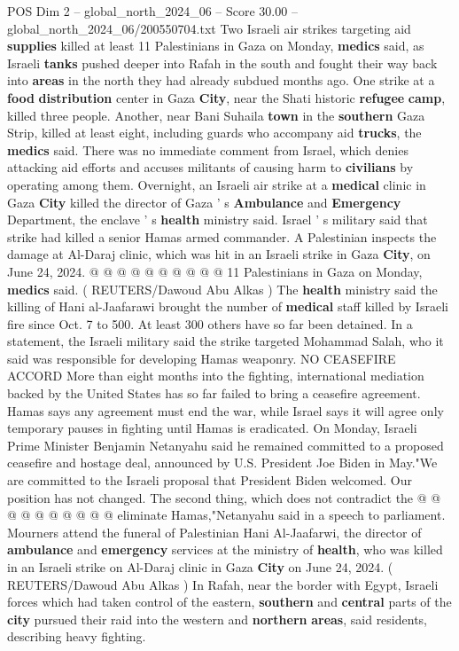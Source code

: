 \begin{textsample}{POS Dim 2 – global\_north\_2024\_06 – Score 30.00 – global\_north\_2024\_06/200550704.txt}  \label{ex:f2_pos_254}
Two Israeli air strikes targeting aid \textbf{supplies} killed at least 11 Palestinians in Gaza on Monday, \textbf{medics} said, as Israeli \textbf{tanks} pushed deeper into Rafah in the south and fought their way back into \textbf{areas} in the north they had already subdued months ago.
One strike at a \textbf{food} \textbf{distribution} center in Gaza \textbf{City}, near the Shati historic \textbf{refugee} \textbf{camp}, killed three people.
Another, near Bani Suhaila \textbf{town} in the \textbf{southern} Gaza Strip, killed at least eight, including guards who accompany aid \textbf{trucks}, the \textbf{medics} said.
There was no immediate comment from Israel, which denies attacking aid efforts and accuses militants of causing harm to \textbf{civilians} by operating among them.
Overnight, an Israeli air strike at a \textbf{medical} clinic in Gaza \textbf{City} killed the director of Gaza ' s \textbf{Ambulance} and \textbf{Emergency} Department, the enclave ' s \textbf{health} ministry said.
Israel ' s military said that strike had killed a senior Hamas armed commander.
A Palestinian inspects the damage at Al-Daraj clinic, which was hit in an Israeli strike in Gaza \textbf{City}, on June 24, 2024. @ @ @ @ @ @ @ @ @ @ 11 Palestinians in Gaza on Monday, \textbf{medics} said. ( REUTERS/Dawoud Abu Alkas ) The \textbf{health} ministry said the killing of Hani al-Jaafarawi brought the number of \textbf{medical} staff killed by Israeli fire since Oct. 7 to 500.
At least 300 others have so far been detained.
In a statement, the Israeli military said the strike targeted Mohammad Salah, who it said was responsible for developing Hamas weaponry.
NO CEASEFIRE ACCORD More than eight months into the fighting, international mediation backed by the United States has so far failed to bring a ceasefire agreement.
Hamas says any agreement must end the war, while Israel says it will agree only temporary pauses in fighting until Hamas is eradicated.
On Monday, Israeli Prime Minister Benjamin Netanyahu said he remained committed to a proposed ceasefire and hostage deal, announced by U.S.
President Joe Biden in May."We are committed to the Israeli proposal that President Biden welcomed.
Our position has not changed.
The second thing, which does not contradict the @ @ @ @ @ @ @ @ @ @ eliminate Hamas,"Netanyahu said in a speech to parliament.
Mourners attend the funeral of Palestinian Hani Al-Jaafarwi, the director of \textbf{ambulance} and \textbf{emergency} services at the ministry of \textbf{health}, who was killed in an Israeli strike on Al-Daraj clinic in Gaza \textbf{City} on June 24, 2024. ( REUTERS/Dawoud Abu Alkas ) In Rafah, near the border with Egypt, Israeli forces which had taken control of the eastern, \textbf{southern} and \textbf{central} parts of the \textbf{city} pursued their raid into the western and \textbf{northern} \textbf{areas}, said residents, describing heavy fighting.

\end{textsample}

